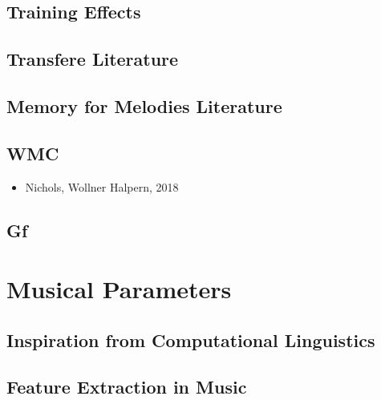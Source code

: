 \documentclass[]{book}
\providecommand{\tightlist}{%
  \setlength{\itemsep}{0pt}\setlength{\parskip}{0pt}}
\theoremstyle{definition}
\theoremstyle{definition}
\theoremstyle{definition}
\theoremstyle{remark}
\begin{document}
\hypertarget{training-effects}{%
\section{Training Effects}\label{training-effects}}

\hypertarget{transfere-literature}{%
\section{Transfere Literature}\label{transfere-literature}}

\hypertarget{memory-for-melodies-literature}{%
\section{Memory for Melodies
Literature}\label{memory-for-melodies-literature}}

\hypertarget{wmc}{%
\section{WMC}\label{wmc}}

\begin{itemize}
\tightlist
\item
  Nichols, Wollner Halpern, 2018
\end{itemize}

\hypertarget{gf}{%
\section{Gf}\label{gf}}

\hypertarget{musical-parameters}{%
\chapter{Musical Parameters}\label{musical-parameters}}

\hypertarget{inspiration-from-computational-linguistics}{%
\section{Inspiration from Computational
Linguistics}\label{inspiration-from-computational-linguistics}}

\hypertarget{feature-extraction-in-music}{%
\section{Feature Extraction in
Music}\label{feature-extraction-in-music}}
\end{document}
